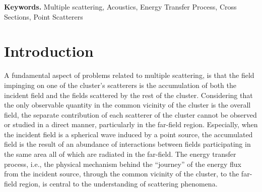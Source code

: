 \documentclass{article}
\begin{document}

\noindent\textbf{Keywords.} Multiple scattering, Acoustics, Energy Transfer Process, Cross Sections, Point Scatterers








\section{Introduction}

A fundamental aspect of problems related to multiple scattering, is that the field impinging on one of the cluster's scatterers is the accumulation of both the incident field and the fields scattered by the rest of the cluster. Considering that the only observable quantity in the common vicinity of the cluster is the overall field, the separate contribution of each scatterer of the cluster cannot be observed or studied in a direct manner, particularly in the far-field region. Especially, when the incident field is a spherical wave induced by a point source, the accumulated field is the result of an abundance of interactions between fields participating in the same area all of which are radiated in the far-field. The energy transfer process, i.e., the physical mechanism behind the ``journey'' of the energy flux from the incident source, through the common vicinity of the cluster, to the far-field region, is central to the understanding of scattering phenomena. 
     
\end{document}
